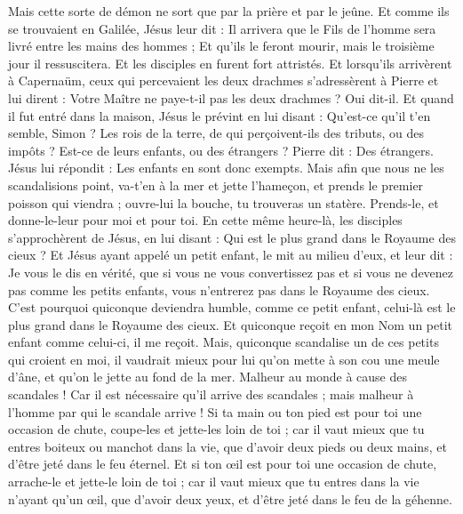 \begin{multicols}{2}
Mais cette sorte de démon ne sort que par la prière et par le jeûne.
Et comme ils se trouvaient en Galilée, Jésus leur dit : Il arrivera que le Fils de l'homme sera livré entre les mains des hommes ;
Et qu'ils le feront mourir, mais le troisième jour il ressuscitera. Et les disciples en furent fort attristés.
Et lorsqu'ils arrivèrent à Capernaüm, ceux qui percevaient les deux drachmes s'adressèrent à Pierre et lui dirent : Votre Maître ne paye-t-il pas les deux drachmes ?
Oui dit-il. Et quand il fut entré dans la maison, Jésus le prévint en lui disant : Qu'est-ce qu'il t'en semble, Simon ? Les rois de la terre, de qui perçoivent-ils des tributs, ou des impôts ? Est-ce de leurs enfants, ou des étrangers ?
Pierre dit : Des étrangers. Jésus lui répondit : Les enfants en sont donc exempts.
Mais afin que nous ne les scandalisions point, va-t'en à la mer et jette l'hameçon, et prends le premier poisson qui viendra ; ouvre-lui la bouche, tu trouveras un statère. Prends-le, et donne-le-leur pour moi et pour toi.
\VerseOne{}En cette même heure-là, les disciples s'approchèrent de Jésus, en lui disant : Qui est le plus grand dans le Royaume des cieux ?
Et Jésus ayant appelé un petit enfant, le mit au milieu d'eux,
et leur dit : Je vous le dis en vérité, que si vous ne vous convertissez pas et si vous ne devenez pas comme les petits enfants, vous n'entrerez pas dans le Royaume des cieux.
C'est pourquoi quiconque deviendra humble, comme ce petit enfant, celui-là est le plus grand dans le Royaume des cieux.
Et quiconque reçoit en mon Nom un petit enfant comme celui-ci, il me reçoit.
Mais, quiconque scandalise un de ces petits qui croient en moi, il vaudrait mieux pour lui qu'on mette à son cou une meule d'âne, et qu'on le jette au fond de la mer.
Malheur au monde à cause des scandales ! Car il est nécessaire qu'il arrive des scandales ; mais malheur à l'homme par qui le scandale arrive !
Si ta main ou ton pied est pour toi une occasion de chute, coupe-les et jette-les loin de toi ; car il vaut mieux que tu entres boiteux ou manchot dans la vie, que d'avoir deux pieds ou deux mains, et d'être jeté dans le feu éternel.
Et si ton œil est pour toi une occasion de chute, arrache-le et jette-le loin de toi ; car il vaut mieux que tu entres dans la vie n'ayant qu'un œil, que d'avoir deux yeux, et d'être jeté dans le feu de la géhenne.

\end{multicols}
